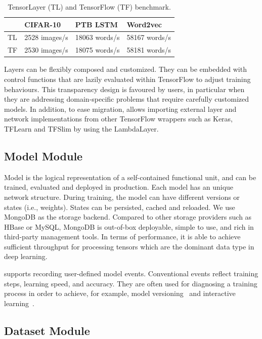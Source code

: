 \begin{table}[]
	\centering
	\caption{TensorLayer (TL) and TensorFlow (TF) benchmark.}
	\label{table:benchmark}
	\begin{tabular}{|l|l|l|l|}
		\hline
		& CIFAR-10 & PTB LSTM & Word2vec \\ \hline
		TL & 2528 images/s     & 18063 words/s        & 58167 words/s    \\ \hline
		TF  & 2530 images/s    & 18075 words/s      & 58181 words/s   \\ \hline
	\end{tabular}
\end{table}


Layers can be flexibly composed and customized. 
They can be embedded with control functions 
that are lazily evaluated within TensorFlow to adjust training behaviours. This transparency design 
is favoured by \tl users, in particular when they are addressing domain-specific problems that 
require carefully customized models. 
In addition, to ease migration, \tl allows importing external layer and network implementations from other TensorFlow wrappers such as Keras, TFLearn and TFSlim by using the LambdaLayer.

\subsection{Model Module}

Model is the logical representation of a self-contained functional unit, and can be trained, evaluated and deployed in production. Each model has an unique network structure. During training, the model can have different versions or states (i.e., weights).
States can be persisted, cached and reloaded. We use MongoDB as the storage backend. 
Compared to other storage providers such as HBase or MySQL, MongoDB is out-of-box deployable,
simple to use, and rich in third-party management tools. In terms of performance,
it is able to achieve sufficient throughput for processing tensors 
which are the dominant data type in deep learning.

\tl supports recording user-defined model events. Conventional events reflect training steps, learning speed, and accuracy.
They are often used for diagnosing a training process in order to achieve, for example, model versioning~\cite{miao2017modelhub} and interactive learning~\cite{jiang2017interactive}. 

\subsection{Dataset Module}

